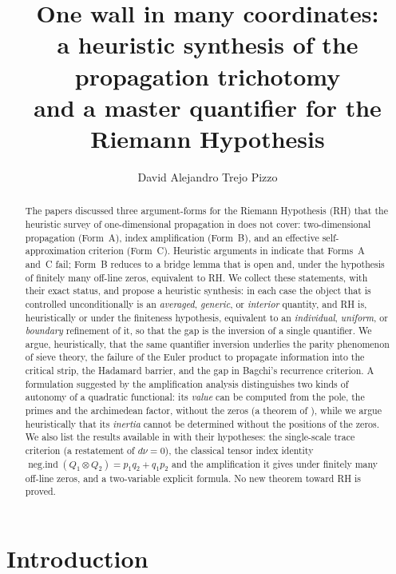 \documentclass[11pt]{amsart}
\title[One Wall in Many Coordinates]{One wall in many coordinates:\\
a heuristic synthesis of the propagation trichotomy\\
and a master quantifier for the Riemann Hypothesis}
\author{David Alejandro Trejo Pizzo}
\theoremstyle{definition}
\theoremstyle{remark}
\newcommand{\negind}{\operatorname{neg.ind}}
\newcommand{\dnu}{d\nu}
\begin{document}
\begin{abstract}
The papers \cite{P27,P28} discussed three argument-forms for the Riemann
Hypothesis (RH) that the heuristic survey of one-dimensional propagation in
\cite{P27} does not cover: two-dimensional propagation (Form~A), index
amplification (Form~B), and an effective self-approximation criterion
(Form~C). Heuristic arguments in \cite{P28} indicate that Forms~A and~C fail;
Form~B reduces to a bridge lemma that is open and, under the hypothesis of
finitely many off-line zeros, equivalent to RH. We collect these statements,
with their exact status, and propose a heuristic synthesis: in each case the
object that is controlled unconditionally is an \emph{averaged},
\emph{generic}, or \emph{interior} quantity, and RH is, heuristically or under
the finiteness hypothesis, equivalent to an
\emph{individual}, \emph{uniform}, or \emph{boundary} refinement of it, so
that the gap is the inversion of a single quantifier. We argue,
heuristically, that the same quantifier inversion underlies the parity
phenomenon of sieve theory, the failure of the Euler product to propagate
information into the critical strip, the Hadamard barrier, and the gap in
Bagchi's recurrence criterion. A formulation suggested by the amplification
analysis distinguishes two kinds of autonomy of a quadratic functional: its
\emph{value} can be computed from the pole, the primes and the archimedean
factor, without the zeros (a theorem of \cite{P28}),
while we argue heuristically that its \emph{inertia} cannot be determined
without the positions of the zeros. We also list the results available in
\cite{P24,P25,P27,P28} with their hypotheses: the single-scale trace
criterion (a restatement of $\dnu=0$), the classical tensor index identity
$\negind(Q_1\otimes Q_2)=p_1q_2+q_1p_2$ and the amplification it gives under
finitely many off-line zeros, and a two-variable explicit formula. No new
theorem toward RH is proved.
\end{abstract}

\maketitle
\tableofcontents
\newpage

\section{Introduction}
\end{document}
